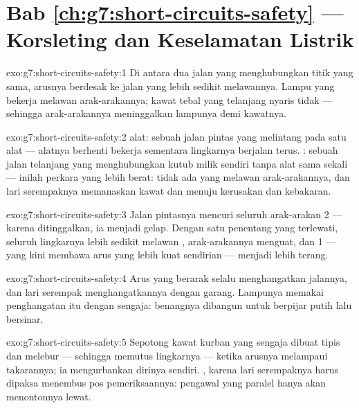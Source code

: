 \section*{Bab \ref{ch:g7:short-circuits-safety} --- Korsleting dan Keselamatan Listrik}

\begin{solution}{exo:g7:short-circuits-safety:1}
Di antara dua jalan yang menghubungkan titik yang sama, arusnya
berdesak ke jalan yang lebih sedikit melawannya. Lampu yang bekerja
melawan arak-arakannya; kawat tebal yang telanjang nyaris tidak ---
sehingga arak-arakannya meninggalkan lampunya demi kawatnya.
\end{solution}

\begin{solution}{exo:g7:short-circuits-safety:2}
 alat: sebuah jalan pintas yang melintang pada satu alat ---
alatnya berhenti bekerja sementara lingkarnya berjalan terus.
 : sebuah jalan telanjang yang menghubungkan kutub
milik  sendiri tanpa alat sama sekali --- inilah perkara yang
lebih berat: tidak ada yang melawan arak-arakannya, dan lari
serempaknya memanaskan kawat dan  menuju kerusakan dan
kebakaran.
\end{solution}

\begin{solution}{exo:g7:short-circuits-safety:3}
Jalan pintasnya mencuri seluruh arak-arakan  2 --- karena
ditinggalkan, ia menjadi gelap. Dengan satu penentang yang terlewati,
seluruh lingkarnya lebih sedikit melawan , arak-arakannya
menguat, dan  1 --- yang kini membawa arus yang lebih kuat
sendirian --- menjadi lebih terang.
\end{solution}

\begin{solution}{exo:g7:short-circuits-safety:4}
Arus yang berarak selalu menghangatkan jalannya, dan lari serempak
menghangatkannya dengan garang. Lampunya memakai penghangatan itu
dengan sengaja: benangnya dibangun untuk berpijar putih lalu bersinar.
\end{solution}

\begin{solution}{exo:g7:short-circuits-safety:5}
Sepotong kawat kurban yang sengaja dibuat tipis dan melebur ---
sehingga memutus lingkarnya --- ketika arusnya melampaui takarannya;
ia mengurbankan dirinya sendiri. , karena lari
serempaknya harus dipaksa menembus pos pemeriksaannya: pengawal yang
paralel hanya akan menontonnya lewat.
\end{solution}

